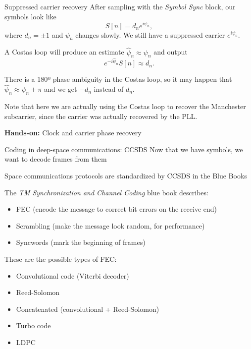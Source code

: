 \documentclass[aspectratio=169]{beamer}
\newcommand{\handson}[1]{\begin{frame}
 \begin{block}{}
   \begin{center}
     \vspace{0.5em}
     {\bf Hands-on:} #1
     \vspace{0.5em}
   \end{center}
 \end{block}
 \end{frame}
}
\begin{document}
\begin{frame}{Suppressed carrier recovery}
  After sampling with the \emph{Symbol Sync} block, our symbols look like
  \[S[n] = d_n e^{i\psi_n},\]where $d_n = \pm 1$ and $\psi_n$ changes slowly. We
  still have a suppressed carrier $e^{i\psi_n}$.

  \medskip
  A
  Costas loop will produce an estimate $\widehat{\psi}_n \approx \psi_n$ and
  output
  \[
  e^{-i\widehat{\psi}_n}S[n] \approx d_n.
  \]
  
  \medskip

  There is a 180º phase ambiguity in the Costas loop, so it may happen that
  $\widehat{\psi}_n \approx \psi_n + \pi$ and we get $-d_n$ instead of $d_n$.

  \medskip

  Note that here we are actually using the Costas loop to recover the Manchester
  subcarrier, since the carrier was actually recovered by the PLL.
\end{frame}

\handson{Clock and carrier phase recovery}

\begin{frame}{Coding in deep-space communications: CCSDS}
  Now that we have symbols, we want to decode frames from them

  \medskip
  
  Space communications protocols are standardized by CCSDS in the Blue Books

  The \emph{TM Synchronization and Channel Coding} blue book describes:
  \begin{itemize}
  \item FEC (encode the message to correct bit errors on the receive end)
  \item Scrambling (make the message look random, for performance)
  \item Syncwords (mark the beginning of frames)
  \end{itemize}

  These are the possible types of FEC:
  \begin{itemize}
  \item Convolutional code (Viterbi decoder)
  \item Reed-Solomon
  \item Concatenated (convolutional + Reed-Solomon)
  \item Turbo code
  \item LDPC
  \end{itemize}
\end{frame}
\end{document}
